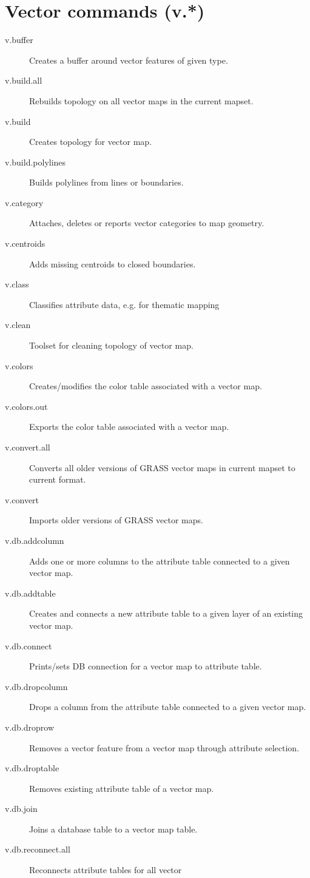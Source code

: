
\section{Vector commands (v.{*})}
\begin{description}
\item [{v.buffer}] Creates a buffer around vector features of given type.
\item [{v.build.all}] Rebuilds topology on all vector maps in the current
mapset.
\item [{v.build}] Creates topology for vector map.
\item [{v.build.polylines}] Builds polylines from lines or boundaries.
\item [{v.category}] Attaches, deletes or reports vector categories to
map geometry.
\item [{v.centroids}] Adds missing centroids to closed boundaries.
\item [{v.class}] Classifies attribute data, e.g. for thematic mapping
\item [{v.clean}] Toolset for cleaning topology of vector map.
\item [{v.colors}] Creates/modifies the color table associated with a vector
map.
\item [{v.colors.out}] Exports the color table associated with a vector
map.
\item [{v.convert.all}] Converts all older versions of GRASS vector maps
in current mapset to current format.
\item [{v.convert}] Imports older versions of GRASS vector maps.
\item [{v.db.addcolumn}] Adds one or more columns to the attribute table
connected to a given vector map.
\item [{v.db.addtable}] Creates and connects a new attribute table to a
given layer of an existing vector map.
\item [{v.db.connect}] Prints/sets DB connection for a vector map to attribute
table.
\item [{v.db.dropcolumn}] Drops a column from the attribute table connected
to a given vector map.
\item [{v.db.droprow}] Removes a vector feature from a vector map through
attribute selection.
\item [{v.db.droptable}] Removes existing attribute table of a vector map.
\item [{v.db.join}] Joins a database table to a vector map table.
\item [{v.db.reconnect.all}] Reconnects attribute tables for all vector

\end{description}
